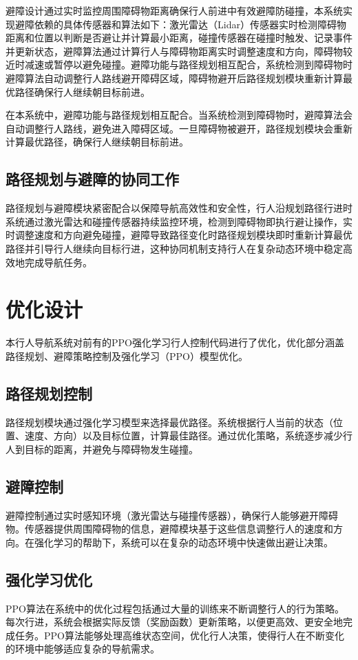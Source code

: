 	避障设计通过实时监控周围障碍物距离确保行人前进中有效避障防碰撞，本系统实现避障依赖的具体传感器和算法如下：激光雷达（Lidar）传感器实时检测障碍物距离和位置以判断是否避让并计算最小距离，碰撞传感器在碰撞时触发、记录事件并更新状态，避障算法通过计算行人与障碍物距离实时调整速度和方向，障碍物较近时减速或暂停以避免碰撞。避障功能与路径规划相互配合，系统检测到障碍物时避障算法自动调整行人路线避开障碍区域，障碍物避开后路径规划模块重新计算最优路径确保行人继续朝目标前进。
	
	在本系统中，避障功能与路径规划相互配合。当系统检测到障碍物时，避障算法会自动调整行人路线，避免进入障碍区域。一旦障碍物被避开，路径规划模块会重新计算最优路径，确保行人继续朝目标前进。
	
	\subsection{路径规划与避障的协同工作}
	
	路径规划与避障模块紧密配合以保障导航高效性和安全性，行人沿规划路径行进时系统通过激光雷达和碰撞传感器持续监控环境，检测到障碍物即执行避让操作，实时调整速度和方向避免碰撞，避障导致路径变化时路径规划模块即时重新计算最优路径并引导行人继续向目标行进，这种协同机制支持行人在复杂动态环境中稳定高效地完成导航任务。
	
	\section{优化设计}
	
	本行人导航系统对前有的PPO强化学习行人控制代码进行了优化，优化部分涵盖路径规划、避障策略控制及强化学习（PPO）模型优化。
	
	\subsection{路径规划控制}
	路径规划模块通过强化学习模型来选择最优路径。系统根据行人当前的状态（位置、速度、方向）以及目标位置，计算最佳路径。通过优化策略，系统逐步减少行人到目标的距离，并避免与障碍物发生碰撞。
	
	\subsection{避障控制}
	避障控制通过实时感知环境（激光雷达与碰撞传感器），确保行人能够避开障碍物。传感器提供周围障碍物的信息，避障模块基于这些信息调整行人的速度和方向。在强化学习的帮助下，系统可以在复杂的动态环境中快速做出避让决策。
	
	\subsection{强化学习优化}
	PPO算法在系统中的优化过程包括通过大量的训练来不断调整行人的行为策略。每次行进，系统会根据实际反馈（奖励函数）更新策略，以便更高效、更安全地完成任务。PPO算法能够处理高维状态空间，优化行人决策，使得行人在不断变化的环境中能够适应复杂的导航需求。
	
